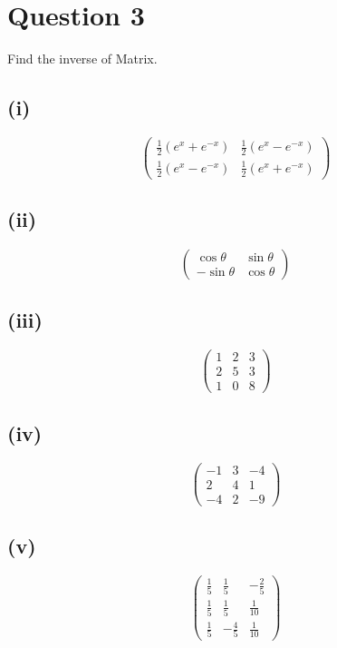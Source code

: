 \documentclass[12pt]{article}
\begin{document}
\section*{Question 3}
Find the inverse of Matrix.

\subsection*{(i)}
\[
\begin{pmatrix}
\frac{1}{2}(e^x + e^{-x}) & \frac{1}{2}(e^x - e^{-x})\\
\frac{1}{2}(e^x - e^{-x}) & \frac{1}{2}(e^x + e^{-x})
\end{pmatrix}
\]

\subsection*{(ii)}
\[
\begin{pmatrix}
\cos\theta & \sin\theta\\
-\sin\theta & \cos\theta
\end{pmatrix}
\]

\subsection*{(iii)}
\[
\begin{pmatrix}
1 & 2 & 3\\
2 & 5 & 3\\
1 & 0 & 8
\end{pmatrix}
\]

\subsection*{(iv)}
\[
\begin{pmatrix}
-1 & 3 & -4\\
2 & 4 & 1\\
-4 & 2 & -9
\end{pmatrix}
\]

\subsection*{(v)}
\[
\begin{pmatrix}
\frac{1}{5} & \frac{1}{5} & -\frac{2}{5}\\
\frac{1}{5} & \frac{1}{5} & \frac{1}{10}\\
\frac{1}{5} & -\frac{4}{5} & \frac{1}{10}
\end{pmatrix}
\]
\end{document}

